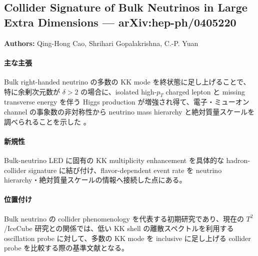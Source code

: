 \subsection{Collider Signature of Bulk Neutrinos in Large Extra Dimensions --- arXiv:hep-ph/0405220}

\textbf{Authors:} Qing-Hong Cao, Shrihari Gopalakrishna, C.-P. Yuan

\paragraph{主な主張}
Bulk right-handed neutrino の多数の KK mode を終状態に足し上げることで、特に余剰次元数が $\delta>2$ の場合に、isolated high-$p_T$ charged lepton と missing transverse energy を伴う Higgs production が増強され得て、電子・ミューオン channel の事象数の非対称性から neutrino mass hierarchy と絶対質量スケールを調べられることを示した \cite{Cao:2004BulkCollider}。

\paragraph{新規性}
Bulk-neutrino LED に固有の KK multiplicity enhancement を具体的な hadron-collider signature に結び付け、flavor-dependent event rate を neutrino hierarchy・絶対質量スケールの情報へ接続した点にある。

\paragraph{位置付け}
Bulk neutrino の collider phenomenology を代表する初期研究であり、現在の $T^2$/IceCube 研究との関係では、低い KK shell の離散スペクトルを利用する oscillation probe に対して、多数の KK mode を inclusive に足し上げる collider probe を比較する際の基準文献となる。
